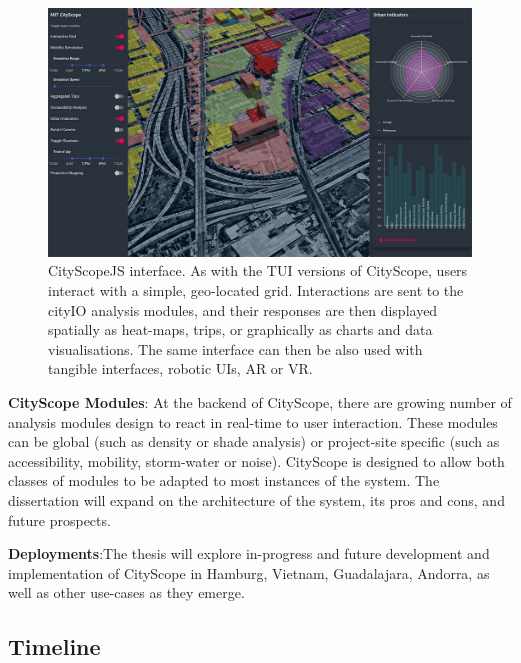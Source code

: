 \begin{figure}[t]
\begin{center}
    \includegraphics[width=1\textwidth]{figures/csjs.jpg}
\end{center}
   \caption{CityScopeJS interface. As with the TUI versions of CityScope, users interact with a simple, geo-located grid. Interactions are sent to the cityIO analysis modules, and their responses are then displayed spatially as heat-maps, trips, or graphically as charts and data visualisations. The same interface can then be also used with tangible interfaces, robotic UIs, AR or VR.}
\label{fig:csjs}
\end{figure}

{\textbf{CityScope Modules}: At the backend of CityScope, there are growing number of analysis modules design to react in real-time to user interaction. These modules can be global (such as density or shade analysis) or project-site specific (such as accessibility, mobility, storm-water or noise). CityScope is designed to allow both classes of modules to be adapted to most instances of the system. The dissertation will expand on the architecture of the system, its pros and cons, and future prospects.}


{\textbf{Deployments}:The thesis will explore in-progress and future development and implementation of CityScope in Hamburg, Vietnam, Guadalajara, Andorra, as well as other use-cases as they emerge.}


\subsection{Timeline}

